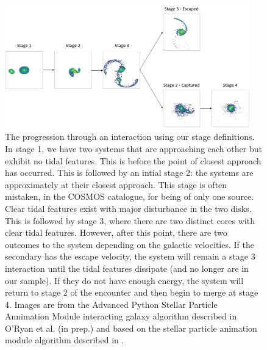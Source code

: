 \begin{figure}
    \centering
    \includegraphics[width=0.95\textwidth]{Chapter3/figures/stage-evolution.jpg}
    \caption{The progression through an interaction using our stage definitions. In stage 1, we have two systems that are approaching each other but exhibit no tidal features. This is before the point of closest approach has occurred. This is followed by an intial stage 2: the systems are approximately at their closest approach. This stage is often mistaken, in the COSMOS catalogue, for being of only one source. Clear tidal features exist with major disturbance in the two disks. This is followed by stage 3, where there are two distinct cores with clear tidal features. However, after this point, there are two outcomes to the system depending on the galactic velocities. If the secondary has the escape velocity, the system will remain a stage 3 interaction until the tidal features dissipate (and no longer are in our sample). If they do not have enough energy, the system will return to stage 2 of the encounter and then begin to merge at stage 4. Images are from the Advanced Python Stellar Particle Annimation Module interacting galaxy algorithm described in O'Ryan et al. (in prep.) and based on the stellar particle animation module algorithm described in \citet{2016A&C....16...26W}.}
    \label{fig:illustration}
\end{figure}

